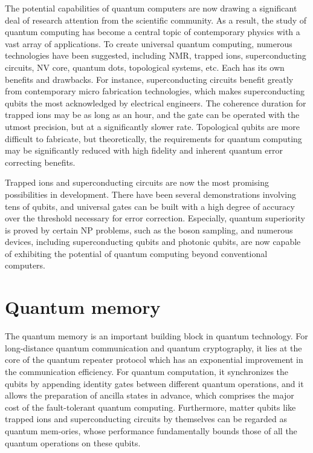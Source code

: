 The potential capabilities of quantum computers are now drawing a significant deal of research attention from the scientific community. As a result, the study of quantum computing has become a central topic of contemporary physics with a vast array of applications. To create universal quantum computing, numerous technologies have been suggested, including NMR, trapped ions, superconducting circuits, NV core, quantum dots, topological systems, etc. Each has its own benefits and drawbacks. For instance, superconducting circuits benefit greatly from contemporary micro fabrication technologies, which makes superconducting qubits the most acknowledged by electrical engineers. The coherence duration for trapped ions may be as long as an hour, and the gate can be operated with the utmost precision, but at a significantly slower rate. Topological qubits are more difficult to fabricate, but theoretically, the requirements for quantum computing may be significantly reduced with high fidelity and inherent quantum error correcting benefits.

Trapped ions and superconducting circuits are now the most promising possibilities in development. There have been several demonstrations involving tens of qubits, and universal gates can be built with a high degree of accuracy over the threshold necessary for error correction. Especially, quantum superiority is proved by certain NP problems, such as the boson sampling, and numerous devices, including superconducting qubits and photonic qubits, are now capable of exhibiting the potential of quantum computing beyond conventional computers.


\section{Quantum memory}

The quantum memory is an important building block in quantum technology. For long-distance quantum communication and quantum cryptography, it lies at the core of the quantum repeater protocol which has an exponential improvement in the communication efficiency. For quantum computation, it synchronizes the qubits by appending identity gates between different quantum operations, and it allows the preparation of ancilla states in advance, which comprises the major cost of the fault-tolerant quantum computing. Furthermore, matter qubits like trapped ions and superconducting circuits by themselves can be regarded as quantum mem-ories, whose performance fundamentally bounds those of all the quantum operations on these qubits.

